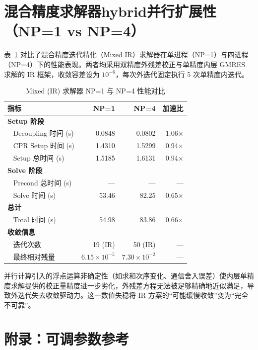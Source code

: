 \documentclass[12pt,a4paper]{article}
\begin{document}
\newpage

\section{混合精度求解器hybrid并行扩展性（NP=1 vs NP=4）}

表~\ref{tab:mixed_scaling} 对比了混合精度迭代精化（Mixed IR）求解器在单进程（NP=1）与四进程（NP=4）下的性能表现。两者均采用双精度外残差校正与单精度内层 GMRES 求解的 IR 框架，收敛容差设为 $10^{-6}$，每次外迭代固定执行 5 次单精度内迭代。

\begin{table}[htbp]
    \centering
    \caption{Mixed (IR) 求解器 NP=1 与 NP=4 性能对比}
    \label{tab:mixed_scaling}
    \begin{tabular}{lrrr}
    \toprule
    指标 & NP=1 & NP=4 & 加速比 \\
    \midrule
    \textbf{Setup 阶段} \\
    ~ Decoupling 时间 (s) & 0.0848 & 0.0802 & 1.06$\times$ \\
    ~ CPR Setup 时间 (s)  & 1.4310 & 1.5299 & 0.94$\times$ \\
    ~ Setup 总时间 (s)    & 1.5185 & 1.6131 & 0.94$\times$ \\
    \midrule
    \textbf{Solve 阶段} \\
    ~ Precond 总时间 (s)  & ---    & ---    & --- \\
    ~ Solve 时间 (s)      & 53.46  & 82.25  & 0.65$\times$ \\
    \midrule
    \textbf{总计} \\
    ~ Total 时间 (s)      & 54.98  & 83.86  & 0.66$\times$ \\
    \midrule
    \textbf{收敛信息} \\
    ~ 迭代次数            & 19 (IR) & 50 (IR) & --- \\
    ~ 最终相对残量        & $6.15\times10^{-5}$ & $7.30\times10^{-2}$ & --- \\
    \bottomrule
    \end{tabular}
    \end{table}

    并行计算引入的浮点运算非确定性（如求和次序变化、通信舍入误差）使内层单精度求解提供的校正量精度进一步劣化，外残差方程无法被足够精确地近似满足，导致外迭代失去收敛驱动力。这一数值失稳将 IR 方案的“可能缓慢收敛”变为“完全不可靠”。
    
\clearpage
\section{附录：可调参数参考}
\end{document}
